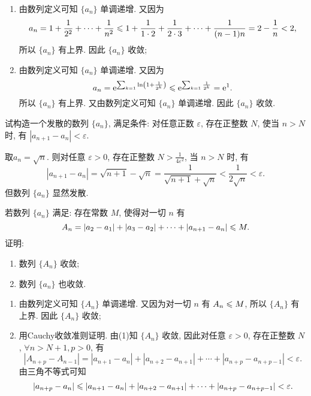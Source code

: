 \begin{solution}
    \begin{enumerate}[(1)]
        \item 由数列定义可知 $\{a_n\}$ 单调递增. 又因为
              $$ a_n = 1 + \frac{1}{2^2} + \cdots + \frac{1}{n^2} \leqslant 1 + \frac{1}{1 \cdot 2} + \frac{1}{2 \cdot 3} + \cdots + \frac{1}{(n-1)n} = 2 - \frac{1}{n} < 2,  $$
              所以 $\{a_n\}$ 有上界. 因此 $\{a_n\}$ 收敛;
        \item 由数列定义可知 $\{a_n\}$ 单调递增. 又因为
              $$a_n = \mathrm{e}^{\sum_{k=1} \ln \left(1 + \frac{1}{2^k}\right)} \leqslant \mathrm{e}^{\sum_{k=1} \frac{1}{2^k}} = \mathrm{e}^1.$$
              所以 $\{a_n\}$ 有上界. 又由数列定义可知 $\{a_n\}$ 单调递增. 因此 $\{a_n\}$ 收敛.
    \end{enumerate}
\end{solution}

\begin{exercise}[1.C.4]
    试构造一个发散的数列 $\{a_n\}$,  满足条件: 对任意正数 $\varepsilon$,  存在正整数 $N$,  使当 $n > N$ 时,  有 $|a_{n+1}-a_n| < \varepsilon$.
\end{exercise}

\begin{solution}
    取$a_n = \sqrt{n}$. 则对任意 $\varepsilon > 0$,  存在正整数 $N > \frac{1}{4\varepsilon^2}$,  当 $n > N$ 时,  有
    $$ |a_{n+1}-a_n| = \sqrt{n+1} - \sqrt{n} = \frac{1}{\sqrt{n+1} + \sqrt{n}} < \frac{1}{2\sqrt{n}} < \varepsilon. $$
    但数列 $\{a_n\}$ 显然发散.
\end{solution}

\begin{exercise}[1.C.5]
    若数列 $\{a_n\}$ 满足: 存在常数 $M$,  使得对一切 $n$ 有
    $$ A_n = |a_2-a_1| + |a_3-a_2| + \cdots + |a_{n+1}-a_n| \leqslant M. $$
    证明:
    \begin{enumerate}[(1)]
        \item 数列 $\{A_n\}$ 收敛;
        \item 数列 $\{a_n\}$ 也收敛.
    \end{enumerate}
\end{exercise}

\begin{solution}
    \begin{enumerate}[(1)]
        \item 由数列定义可知 $\{A_n\}$ 单调递增. 又因为对一切 $n$ 有 $A_n \leqslant M$,  所以 $\{A_n\}$ 有上界. 因此 $\{A_n\}$ 收敛;
        \item 用Cauchy收敛准则证明. 由(1)知 $\{A_n\}$ 收敛,  因此对任意 $\varepsilon > 0$,  存在正整数 $N$,  $\forall n > N+1,  p > 0$,  有
              $$ |A_{n+p} - A_{n-1}| = |a_{n+1}-a_n| + |a_{n+2}-a_{n+1}| + \cdots + |a_{n+p}-a_{n+p-1}| < \varepsilon. $$
              由三角不等式可知
              $$ |a_{n+p} - a_n| \leqslant |a_{n+1}-a_n| + |a_{n+2}-a_{n+1}| + \cdots + |a_{n+p}-a_{n+p-1}| < \varepsilon. $$
    \end{enumerate}
\end{solution}


